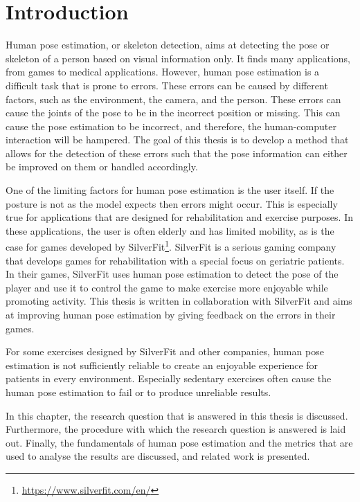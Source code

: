 \chapter{Introduction}
\setcounter{page}{1}
Human pose estimation, or skeleton detection, aims at detecting the pose or skeleton of a person based on visual information only. It finds many applications, from games to medical applications\cite{kumarapu2020animepose, ClinicalApplicationChen, MedicalAnimation}. However, human pose estimation is a difficult task that is prone to errors\cite{HPEIsHard}. These errors can be caused by different factors, such as the environment, the camera, and the person. These errors can cause the joints of the pose to be in the incorrect position or missing. This can cause the pose estimation to be incorrect, and therefore, the human-computer interaction will be hampered. The goal of this thesis is to develop a method that allows for the detection of these errors such that the pose information can either be improved on them or handled accordingly.

One of the limiting factors for human pose estimation is the user itself. If the posture is not as the model expects then errors might occur. This is especially true for applications that are designed for rehabilitation and exercise purposes. In these applications, the user is often elderly and has limited mobility, as is the case for games developed by SilverFit\footnote{\url{https://www.silverfit.com/en/}}. SilverFit is a serious gaming company that develops games for rehabilitation with a special focus on geriatric patients. In their games, SilverFit uses human pose estimation to detect the pose of the player and use it to control the game to make exercise more enjoyable while promoting activity. This thesis is written in collaboration with SilverFit and aims at improving human pose estimation by giving feedback on the errors in their games.

For some exercises designed by SilverFit and other companies, human pose estimation is not sufficiently reliable to create an enjoyable experience for patients in every environment. Especially sedentary exercises often cause the human pose estimation to fail or to produce unreliable results.

In this chapter, the research question that is answered in this thesis is discussed. Furthermore, the procedure with which the research question is answered is laid out. Finally, the fundamentals of human pose estimation and the metrics that are used to analyse the results are discussed, and related work is presented.


